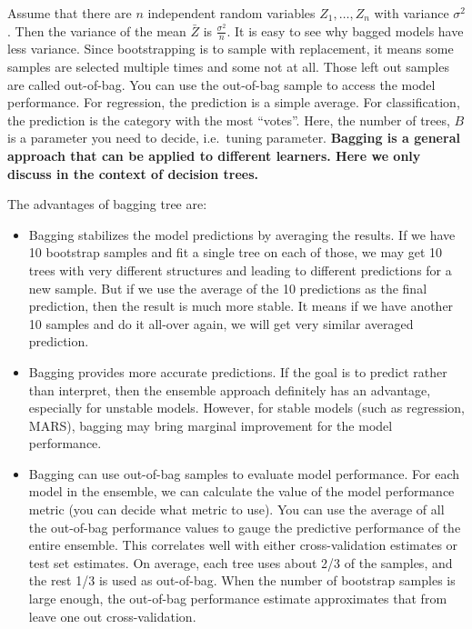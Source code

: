 \documentclass[12pt,]{krantz}
\begin{document}
Assume that there are \(n\) independent random variables \(Z_1,\dots,Z_n\) with variance \(\sigma^2\). Then the variance of the mean \(\bar{Z}\) is \(\frac{\sigma^2}{n}\). It is easy to see why bagged models have less variance. Since bootstrapping is to sample with replacement, it means some samples are selected multiple times and some not at all. Those left out samples are called out-of-bag. You can use the out-of-bag sample to access the model performance. For regression, the prediction is a simple average. For classification, the prediction is the category with the most ``votes''. Here, the number of trees, \(B\) is a parameter you need to decide, i.e.~tuning parameter. \textbf{Bagging is a general approach that can be applied to different learners. Here we only discuss in the context of decision trees.}

The advantages of bagging tree are:

\begin{itemize}
\item
  Bagging stabilizes the model predictions by averaging the results. If we have 10 bootstrap samples and fit a single tree on each of those, we may get 10 trees with very different structures and leading to different predictions for a new sample. But if we use the average of the 10 predictions as the final prediction, then the result is much more stable. It means if we have another 10 samples and do it all-over again, we will get very similar averaged prediction.
\item
  Bagging provides more accurate predictions. If the goal is to predict rather than interpret, then the ensemble approach definitely has an advantage, especially for unstable models. However, for stable models (such as regression, MARS), bagging may bring marginal improvement for the model performance.
\item
  Bagging can use out-of-bag samples to evaluate model performance. For each model in the ensemble, we can calculate the value of the model performance metric (you can decide what metric to use). You can use the average of all the out-of-bag performance values to gauge the predictive performance of the entire ensemble. This correlates well with either cross-validation estimates or test set estimates. On average, each tree uses about 2/3 of the samples, and the rest 1/3 is used as out-of-bag. When the number of bootstrap samples is large enough, the out-of-bag performance estimate approximates that from leave one out cross-validation.
\end{itemize}
\end{document}

